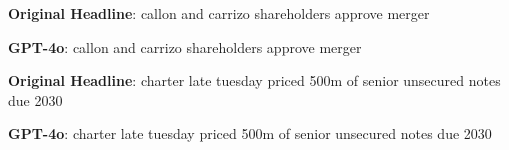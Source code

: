 \begin{tcolorbox}[colback=white,colframe=black!75!white] 
    \begin{minipage}{0.475\textwidth}
    \centering
    \begin{tcolorbox}[colback=black!5!white,colframe=black!75!white, fontupper=\small, fontlower=\small] 
    \textbf{Original Headline}: callon and carrizo shareholders approve merger
    \end{tcolorbox}
    \end{minipage} 
    \hfill
    \begin{minipage}{0.475\textwidth}
    \centering
    \begin{tcolorbox}[colback=black!5!white,colframe=black!75!white, fontupper=\small, fontlower=\small] 
    \textbf{GPT-4o}: callon and carrizo shareholders approve merger
    \end{tcolorbox}
    \end{minipage}
\end{tcolorbox}
\begin{tcolorbox}[colback=white,colframe=black!75!white] 
    \begin{minipage}{0.475\textwidth}
    \centering
    \begin{tcolorbox}[colback=black!5!white,colframe=black!75!white, fontupper=\small, fontlower=\small] 
    \textbf{Original Headline}: charter late tuesday priced 500m of senior unsecured notes due 2030
    \end{tcolorbox}
    \end{minipage} 
    \hfill
    \begin{minipage}{0.475\textwidth}
    \centering
    \begin{tcolorbox}[colback=black!5!white,colframe=black!75!white, fontupper=\small, fontlower=\small] 
    \textbf{GPT-4o}: charter late tuesday priced 500m of senior unsecured notes due 2030
    \end{tcolorbox}
    \end{minipage}
\end{tcolorbox}